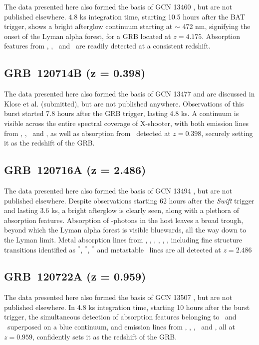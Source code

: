 \documentclass[longauth]{aa}    %
\begin{document}
The data presented here also formed the basis of GCN 13460 \citep{GCN13460}, but
are not published elsewhere. 4.8 ks integration time, starting 10.5 hours after
the BAT trigger, shows a bright afterglow continuum starting at $\sim$ 472 nm,
signifying the onset of the Lyman alpha forest, for a GRB located at $z =
4.175$. Absorption features from \lya, \feii, \mgii~and \SIii~are readily
detected at a consistent redshift.

\subsection{GRB~120714B (z = 0.398)} \label{120714}

The data presented here also formed the basis of GCN 13477 \citep{GCN13477} and
are discussed in Klose et al. (submitted), but are not published anywhere.
Observations of this burst started 7.8 hours after the GRB trigger, lasting 4.8
ks. A continuum is visible across the entire spectral coverage of X-shooter,
with both emission lines from  \oii, \hb, \oiii~and \ha, as well as absorption
from \mgii~detected at $z = 0.398$, securely setting it as the redshift of the
GRB.


\subsection{GRB~120716A (z = 2.486)} \label{120716}

The data presented here also formed the basis of GCN 13494 \citep{GCN13494}, but
are not published elsewhere. Despite observations starting 62 hours after the
\textit{Swift} trigger and lasting 3.6 ks, a bright afterglow is clearly seen,
along with a plethora of absorption features. Absorption of \lya-photons in the
host leaves a broad trough, beyond which the Lyman alpha forest is visible
bluewards, all the way down to the Lyman limit. Metal absorption lines from
\cii, \SIii, \oi, \feii, \civ, \SIiv, including fine structure transitions
identified as \cii$^*$, \SIii$^*$, \feii$^*$ and metastable \NIii~lines are all
detected at $z = 2.486$


\subsection{GRB~120722A (z = 0.959)} \label{120722}

The data presented here also formed the basis of GCN 13507 \citep{GCN13507}, but
are not published elsewhere. In 4.8 ks integration time, starting 10 hours after
the burst trigger, the simultaneous detection of absorption features belonging
to \mgii~and \feii~superposed on a blue continuum, and emission lines from \oii,
\hg, \hb, \oiii~and \ha, all at $z = 0.959$, confidently sets it as the redshift
of the GRB.
\end{document}
